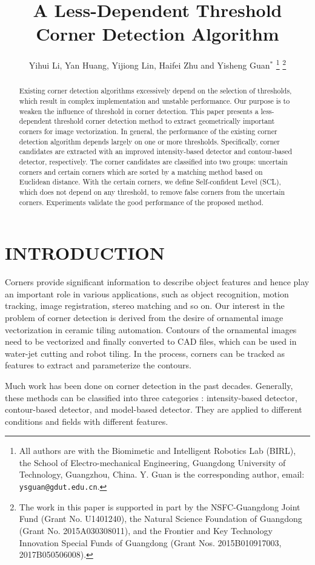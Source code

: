 \documentclass[letterpaper, 10 pt, conference]{ieeeconf}  %
\title{\LARGE \bf
A Less-Dependent Threshold Corner Detection Algorithm
}
\author{Yihui Li, Yan Huang, Yijiong Lin, Haifei Zhu and Yisheng Guan$^{*}$   %
\thanks{ 
All authors are with the Biomimetic and Intelligent Robotics Lab (BIRL), the School of Electro-mechanical Engineering, Guangdong University of Technology, Guangzhou, China. Y. Guan is the corresponding author, email: {\tt\small ysguan@gdut.edu.cn}.}
\thanks{
The work in this paper is supported in part by the NSFC-Guangdong Joint Fund (Grant No. U1401240), the Natural Science Foundation of Guangdong (Grant No. 2015A030308011), and the Frontier and Key Technology Innovation Special Funds of Guangdong (Grant Nos. 2015B010917003, 2017B050506008).}
}
\begin{document}
\maketitle
\thispagestyle{empty}
\pagestyle{empty}


\begin{abstract}

Existing corner detection algorithms excessively depend on the selection of thresholds, which result in complex implementation and unstable performance. Our purpose is to weaken the influence of threshold in corner detection. This paper presents a less-dependent threshold corner detection method to extract geometrically important corners for image vectorization. In general, the performance of the existing corner detection algorithm depends largely on one or more thresholds. Specifically, corner candidates are extracted with an improved intensity-based detector and contour-based detector, respectively. The corner candidates are classified into two groups: uncertain corners and certain corners which are sorted by a matching method based on Euclidean distance. With the certain corners, we define Self-confident Level (SCL), which does not depend on any threshold, to remove false corners from the uncertain corners. Experiments validate the good performance of the proposed method.

\end{abstract}
\section{INTRODUCTION}
Corners provide significant information to describe object features and hence play an important role in various applications, such as object recognition, motion tracking, image registration, stereo matching and so on. Our interest in the problem of corner detection is derived from the desire of ornamental image vectorization in ceramic tiling automation. Contours of the ornamental images need to be vectorized and finally converted to CAD files, which can be used in water-jet cutting and robot tiling. In the process, corners can be tracked as features to extract and parameterize the contours. 

Much work has been done on corner detection in the past decades. Generally, these methods can be classified into three categories \cite{Kahaki2014Contour}: intensity-based detector, contour-based detector, and model-based detector. They are applied to different conditions and fields with different features. 
\end{document}
